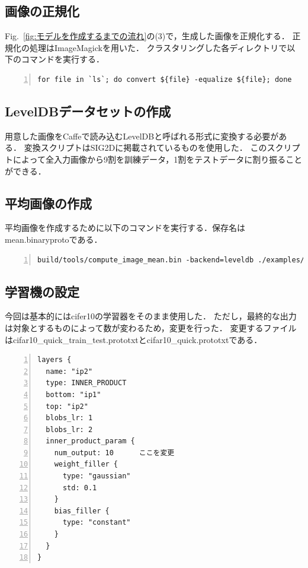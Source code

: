 \documentclass[a4paper,10pt]{jsarticle}
\begin{document}
\subsection{画像の正規化}
Fig.~\ref{fig:モデルを作成するまでの流れ}の(3)で，生成した画像を正規化する．
正規化の処理はImageMagickを用いた．
クラスタリングした各ディレクトリで以下のコマンドを実行する．

\begin{lstlisting}[basicstyle=\ttfamily\footnotesize, frame=single, firstnumber=1, numbers=left, breaklines=true]
for file in `ls`; do convert ${file} -equalize ${file}; done
\end{lstlisting}

\subsection{LevelDBデータセットの作成}
用意した画像をCaffeで読み込むLevelDBと呼ばれる形式に変換する必要がある．
変換スクリプトはSIG2D\cite{SIG2D}に掲載されているものを使用した．
このスクリプトによって全入力画像から9割を訓練データ，1割をテストデータに割り振ることができる．

\subsection{平均画像の作成}
平均画像を作成するために以下のコマンドを実行する．保存名はmean.binaryprotoである．
\begin{lstlisting}[basicstyle=\ttfamily\footnotesize, frame=single, firstnumber=1, numbers=left, breaklines=true]
build/tools/compute_image_mean.bin -backend=leveldb ./examples/cifar10/cifar10_train_leveldb ./examples/cifar10/mean.binaryproto
\end{lstlisting}

\subsection{学習機の設定}
今回は基本的にはcifer10の学習器をそのまま使用した．
ただし，最終的な出力は対象とするものによって数が変わるため，変更を行った．
変更するファイルはcifar10\_quick\_train\_test.prototxtとcifar10\_quick.prototxtである．

\begin{lstlisting}[basicstyle=\ttfamily\footnotesize, frame=single, firstnumber=1, numbers=left, breaklines=true]
layers {
  name: "ip2"
  type: INNER_PRODUCT
  bottom: "ip1"
  top: "ip2"
  blobs_lr: 1
  blobs_lr: 2
  inner_product_param {
    num_output: 10      ここを変更
    weight_filler {
      type: "gaussian"
      std: 0.1
    }
    bias_filler {
      type: "constant"
    }
  }
}
\end{lstlisting}
\end{document}
